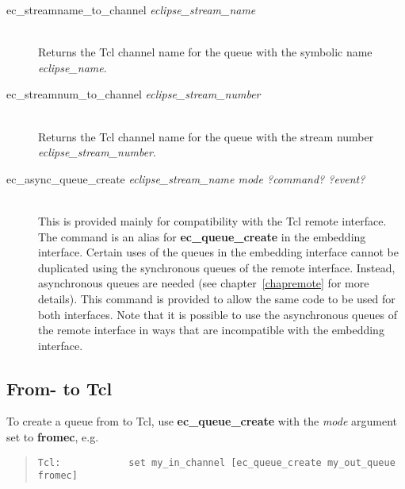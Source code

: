 \begin{description}
\item[ec_streamname_to_channel {\it eclipse_stream_name}]\ \\
	Returns the Tcl channel name for the  queue with the
	symbolic name {\it eclipse_name}. 

\item[ec_streamnum_to_channel {\it eclipse_stream_number}]\ \\
	Returns the Tcl channel name for the  queue with the
	{\eclipse} stream number {\it eclipse_stream_number}. 

\item[ec_async_queue_create {\it eclipse_stream_name mode
	?command? ?event?}]\ \\
	This is provided mainly for compatibility with the Tcl remote
	interface. The command is an alias for {\bf ec_queue_create} in the
	embedding interface. Certain uses of the queues in the embedding
	interface cannot be duplicated using the synchronous queues of the
	remote interface. Instead, asynchronous queues are needed (see
	chapter~\ref{chapremote} for more details). This command is
	provided to allow the same code to be used for both interfaces. 
	Note that it is possible to use the asynchronous queues of the remote
	interface in ways that are incompatible with the embedding interface.

\end{description}

\subsection{From-{\eclipse} to Tcl}
To create a queue from {\eclipse} to Tcl, use {\bf ec_queue_create} with
the {\it mode\/} argument set to {\bf fromec}, e.g.\

\begin{quote}\begin{verbatim}
Tcl:            set my_in_channel [ec_queue_create my_out_queue fromec]
\end{verbatim}\end{quote}

